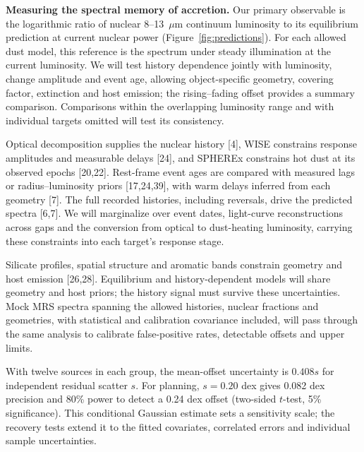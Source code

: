 \documentclass[12pt]{article}
\begin{document}
\clearpage
\noindent\textbf{Measuring the spectral memory of accretion.}
Our primary observable is the logarithmic ratio of nuclear 8--13~$\mu$m continuum luminosity to its equilibrium prediction at current nuclear power (Figure~\ref{fig:predictions}). For each allowed dust model, this reference is the spectrum under steady illumination at the current luminosity. We will test history dependence jointly with luminosity, change amplitude and event age, allowing object-specific geometry, covering factor, extinction and host emission; the rising--fading offset provides a summary comparison. Comparisons within the overlapping luminosity range and with individual targets omitted will test its consistency.

Optical decomposition supplies the nuclear history [4], WISE constrains response amplitudes and measurable delays [24], and SPHEREx constrains hot dust at its observed epochs [20,22]. Rest-frame event ages are compared with measured lags or radius--luminosity priors [17,24,39], with warm delays inferred from each geometry [7]. The full recorded histories, including reversals, drive the predicted spectra [6,7]. We will marginalize over event dates, light-curve reconstructions across gaps and the conversion from optical to dust-heating luminosity, carrying these constraints into each target's response stage.

Silicate profiles, spatial structure and aromatic bands constrain geometry and host emission [26,28]. Equilibrium and history-dependent models will share geometry and host priors; the history signal must survive these uncertainties. Mock MRS spectra spanning the allowed histories, nuclear fractions and geometries, with statistical and calibration covariance included, will pass through the same analysis to calibrate false-positive rates, detectable offsets and upper limits.

With twelve sources in each group, the mean-offset uncertainty is $0.408s$ for independent residual scatter $s$. For planning, $s=0.20$ dex gives 0.082 dex precision and 80\% power to detect a 0.24 dex offset (two-sided $t$-test, 5\% significance). This conditional Gaussian estimate sets a sensitivity scale; the recovery tests extend it to the fitted covariates, correlated errors and individual sample uncertainties.
\end{document}
